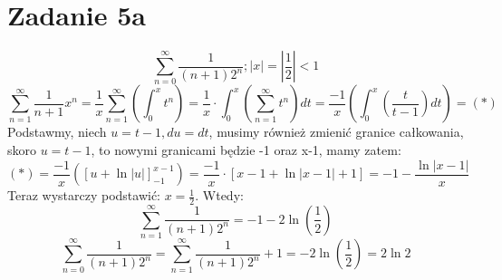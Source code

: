 \documentclass{article}
\begin{document}
\section*{Zadanie 5a}
$$\sum_{n=0}^{\infty} \frac{1}{(n+1)2^n}; |x| = |\frac{1}{2}| < 1$$
$$\sum_{n=1}^{\infty} \frac{1}{n+1}x^n = \frac{1}{x} \sum_{n=1}^{\infty} \left(  \int_{0}^{x} t^n\right) = \frac{1}{x} \cdot  \int_{0}^{x} \left(  \sum_{n=1}^{\infty} t^n\right) dt = \frac{-1}{x}\left(  \int_{0}^{x} \left( \frac{t}{t-1}\right)  dt\right)   = (*)$$
Podstawmy, niech $u=t-1, du = dt$, musimy również zmienić granice całkowania, skoro $u = t-1$, to nowymi granicami będzie -1 oraz x-1, mamy zatem:
$$(*) = \frac{-1}{x} ([u+ \ln|u|]_{-1}^{x-1}) = \frac{-1}{x} \cdot [x-1 + \ln|x-1|+1] = -1 - \frac{\ln|x-1|}{x}$$
Teraz wystarczy podstawić: $x = \frac{1}{2}$. Wtedy:
$$\sum_{n=1}^{\infty}\frac{1}{(n+1)2^{n}}=-1-2\ln\left(\frac{1}{2}\right)$$
$$\sum_{n=0}^{\infty}\frac{1}{(n+1)2^{n}} = \sum_{n=1}^{\infty}\frac{1}{(n+1)2^{n}} + 1 = -2\ln\left(\frac{1}{2}\right) = 2\ln 2$$
\end{document}
